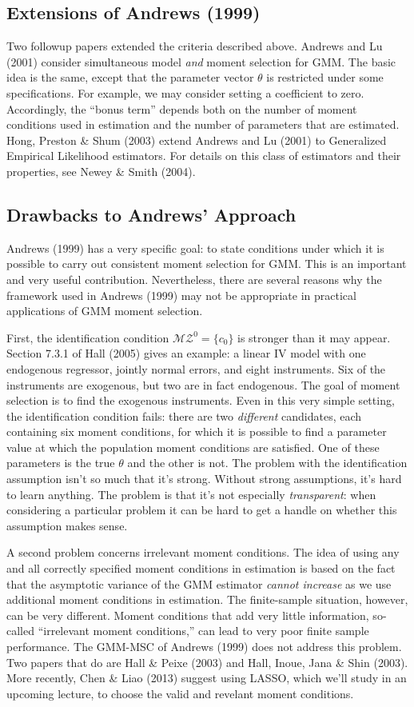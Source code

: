 \documentclass[12pt]{article}
\theoremstyle{definition}
\begin{document}
\subsection{Extensions of Andrews (1999)}
Two followup papers extended the criteria described above. Andrews and Lu (2001) consider simultaneous model \emph{and} moment selection for GMM. The basic idea is the same, except that the parameter vector $\theta$ is restricted under some specifications. For example, we may consider setting a coefficient to zero. Accordingly, the ``bonus term'' depends both on the number of moment conditions used in estimation and the number of parameters that are estimated. Hong, Preston \& Shum (2003) extend Andrews and Lu (2001) to Generalized Empirical Likelihood estimators. For details on this class of estimators and their properties, see Newey \& Smith (2004). 

\subsection{Drawbacks to Andrews' Approach}
Andrews (1999) has a very specific goal: to state conditions under which it is possible to carry out consistent moment selection for GMM. This is an important and very useful contribution. Nevertheless, there are several reasons why the framework used in Andrews (1999) may not be appropriate in practical applications of GMM moment selection. 

First, the identification condition $\mathcal{MZ}^0 = \{c_0\}$ is stronger than it may appear. Section 7.3.1 of Hall (2005) gives an example: a linear IV model with one endogenous regressor, jointly normal errors, and eight instruments. Six of the instruments are exogenous, but two are in fact endogenous. The goal of moment selection is to find the exogenous instruments. Even in this very simple setting, the identification condition fails: there are two \emph{different} candidates, each containing six moment conditions, for which it is possible to find a parameter value at which the population moment conditions are satisfied. One of these parameters is the true $\theta$ and the other is not. The problem with the identification assumption isn't so much that it's strong. Without strong assumptions, it's hard to learn anything. The problem is that it's not especially \emph{transparent}: when considering a particular problem it can be hard to get a handle on whether this assumption makes sense.  


A second problem concerns irrelevant moment conditions. The idea of using any and all correctly specified moment conditions in estimation is based on the fact that the asymptotic variance of the GMM estimator \emph{cannot increase} as we use additional moment conditions in estimation. The finite-sample situation, however, can be very different. Moment conditions that add very little information, so-called ``irrelevant moment conditions,'' can lead to very poor finite sample performance. The GMM-MSC of Andrews (1999) does not address this problem. Two papers that do are Hall \& Peixe (2003) and Hall, Inoue, Jana \& Shin (2003). More recently, Chen \& Liao (2013) suggest using LASSO, which we'll study in an upcoming lecture, to choose the valid and revelant moment conditions.
\end{document}
